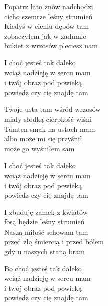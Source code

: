 \begin{text}
    Popatrz lato znów nadchodzi\\
    cicho szemrze leśny strumień\\
    Kiedyś w cieniu dębów tam\\
    zobaczyłem jak w zadumie\\
    bukiet z wrzosów pleciesz nam

    I choć jesteś tak daleko\\
    wciąż nadzieję w sercu mam\\
    i twój obraz pod powieką\\
    powiedz czy cię znajdę tam

    Twoje usta tam wśród wrzosów\\
    miały słodką cierpkość wiśni\\
    Tamten smak na ustach mam\\
    albo może mi się przyśnił\\
    może go wyśniłem sam

    I choć jesteś tak daleko\\
    wciąż nadzieję w sercu mam\\
    i twój obraz pod powieką\\
    powiedz czy cię znajdę tam

    I zbuduję zamek z kwiatów\\
    fosą będzie leśny strumień\\
    Naszą miłość schowam tam\\
    przed złą śmiercią i przed bólem\\
    gdy u naszych staną bram

    Bo choć jesteś tak daleko\\
    wciąż nadzieję w sercu mam\\
    i twój obraz pod powieką\\
    powiedz czy cię znajdę tam
\end{text}
\begin{chord}

\end{chord}